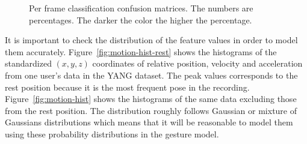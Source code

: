 \begin{figure}[!hp]
\centering
{}
\caption{Per frame
classification confusion matrices. The numbers are
percentages. The darker the color the higher the percentage.}
\label{fig:confusion}
\end{figure}

\newpage
It is important to check the distribution of
the feature values in order to model them accurately.
Figure~\ref{fig:motion-hist-rest} shows the histograms of the standardized $(x, y, z)$ coordinates of relative position, velocity and acceleration from one user's data in the YANG dataset. The peak values corresponds to the rest position
because it is the most frequent pose in the recording.
Figure~\ref{fig:motion-hist} shows the histograms of the same data excluding
those from the rest position. The distribution roughly follows
Gaussian or mixture of Gaussians distributions which means that it will be
reasonable to model them using these probability distributions in the gesture
model.

